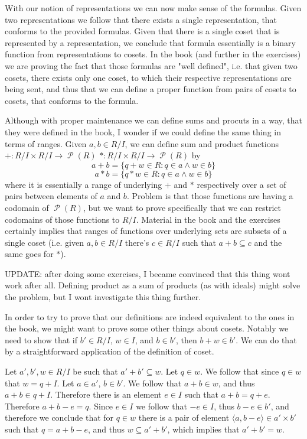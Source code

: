 \documentclass[11pt,oneside,titlepage]{book}
\DeclareMathOperator \pow {\mathcal {P}}
\newcommand{\eangle}[1]{\langle #1 \rangle}
\newcommand{\set}[1]{\{ #1 \}}
\begin{document}
With our notion of representations we can now make sense of the
formulas. Given two representations we follow that there exists a
single representation, that conforms to the provided formulas. Given
that there is a single coset that is represented by a representation,
we conclude that formula essentially is a binary function from
representations to cosets. In the book (and further in the exercises)
we are proving the fact that those formulas are "well defined",
i.e. that given two cosets, there exists only one coset, to which
their respective representations are being sent, and thus that we can
define a proper function from pairs of cosets to cosets, that conforms
to the formula.

Although with proper maintenance we can define sums and procuts in a
way, that they were defined in the book, I wonder if we could define
the same thing in terms of ranges.  Given $a, b \in R/I$, we can
define sum and product functions $+: R/I \times R/I \to \pow(R)$ $*:
R/I \times R/I \to \pow(R)$ by
$$a + b = \set{q + w \in R: q \in a \land w \in b}$$
$$a * b = \set{q * w \in R: q \in a \land w \in b}$$
where it is essentially a range of underlying $+$ and $*$ respectively
over a set of pairs between elements of $a$ and $b$. Problem is that
those functions are having a codomain of $\pow(R)$, but we want to
prove specifically that we can restrict codomains of those functions
to $R/I$. Material in the book and the exercises certainly implies
that ranges of functions over underlying sets are subsets of a single
coset (i.e. given $a, b \in R/I$ there's $c \in R/I$ such that $a + b
\subseteq c$ and the same goes for $*$).

UPDATE: after doing some exercises, I became convinced that this thing
wont work after all. Defining product as a sum of products (as with
ideals) might solve the problem, but I wont investigate this thing
further.

In order to try to prove that our definitions are indeed equivalent to
the ones in the book, we might want to prove some other things about
cosets. Notably we need to show that if $b' \in R/I$, $w \in I$, and
$b \in b'$, then $b + w \in b'$. We can do that by a straightforward
application of the definition of coset.

Let $a', b', w \in R/I$ be such that $a' + b' \subseteq w$. Let $q \in
w$.  We follow that since $q \in w$ that $w = q + I$. Let $a \in a'$,
$b \in b'$.  We follow that $a + b \in w$, and thus $a + b \in q +
I$. Therefore there is an element $e \in I$ such that $a + b = q +
e$. Therefore $a + b - e = q$. Since $e \in I$ we follow that $-e \in
I$, thus $b - e \in b'$, and therefore we conclude that for $q \in w$
there is a pair of element $\eangle{a, b - e} \in a' \times b'$ such
that $q = a + b - e$, and thus $w \subseteq a' + b'$, which implies
that $a' + b' = w$.
\end{document}
